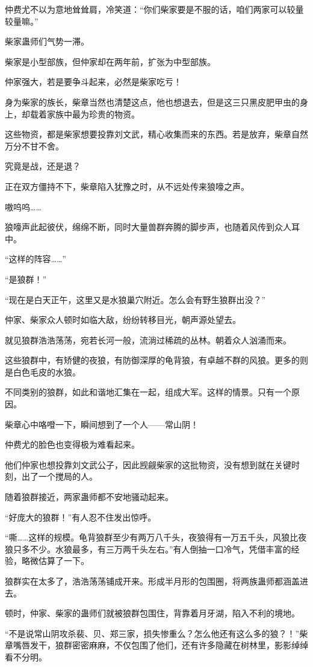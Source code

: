 \begin{this_body}
仲费尤不以为意地耸耸肩，冷笑道：“你们柴家要是不服的话，咱们两家可以较量较量嘛。”

柴家蛊师们气势一滞。

柴家是小型部族，但仲家却在两年前，扩张为中型部族。

仲家强大，若是要争斗起来，必然是柴家吃亏！

身为柴家的族长，柴章当然也清楚这点，他也想退去，但是这三只黑皮肥甲虫的身上，却载着家族中最为珍贵的物资。

这些物资，都是柴家想要投靠刘文武，精心收集而来的东西。若是放弃，柴章自然万分不甘不舍。

究竟是战，还是退？

正在双方僵持不下，柴章陷入犹豫之时，从不远处传来狼嚎之声。

嗷呜呜……

狼嚎声此起彼伏，绵绵不断，同时大量兽群奔腾的脚步声，也随着风传到众人耳中。

“这样的阵容……”

“是狼群！”

“现在是白天正午，这里又是水狼巢穴附近。怎么会有野生狼群出没？”

仲家、柴家众人顿时如临大敌，纷纷转移目光，朝声源处望去。

就见狼群浩浩荡荡，宛若长河一般，流淌过稀疏的丛林。朝着众人汹涌而来。

这些狼群中，有矫健的夜狼，有防御深厚的龟背狼，有卓越不群的风狼。更多的则是白色毛皮的水狼。

不同类别的狼群，如此和谐地汇集在一起，组成大军。这样的情景。只有一个原因。

柴章心中咯噔一下，瞬间想到了一个人——常山阴！

仲费尤的脸色也变得极为难看起来。

他们仲家也想投靠刘文武公子，因此觊觎柴家的这批物资，没有想到就在关键时刻，出了一个搅局的人。

随着狼群接近，两家蛊师都不安地骚动起来。

“好庞大的狼群！”有人忍不住发出惊呼。

“嘶……这样的规模。龟背狼群至少有两万八千头，夜狼得有一万五千头，风狼比夜狼只多不少。水狼最多，有三万两千头左右。”有人倒抽一口冷气，凭借丰富的经验，略微估算了一下。

狼群实在太多了，浩浩荡荡铺成开来。形成半月形的包围圈，将两族蛊师都涵盖进去。

顿时，仲家、柴家的蛊师们就被狼群包围住，背靠着月牙湖，陷入不利的境地。

“不是说常山阴攻杀裴、贝、郑三家，损失惨重么？怎么他还有这么多的狼？！”柴章嘴唇发干，狼群密密麻麻，不仅包围了他们，还有许多隐藏在树林里，影影绰绰看不分明。


\end{this_body}
